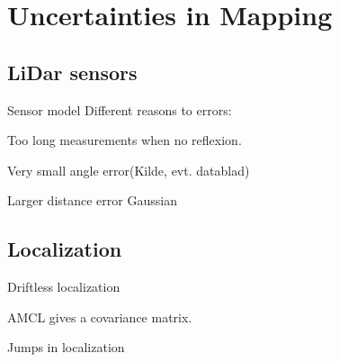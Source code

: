 \section{Uncertainties in Mapping}

\subsection{LiDar sensors}
Sensor model Different reasons to errors:

Too long measurements when no reflexion.

Very small angle error(Kilde, evt. datablad)

Larger distance error Gaussian


\subsection{Localization}
Driftless localization

AMCL gives a covariance matrix. 

Jumps in localization
